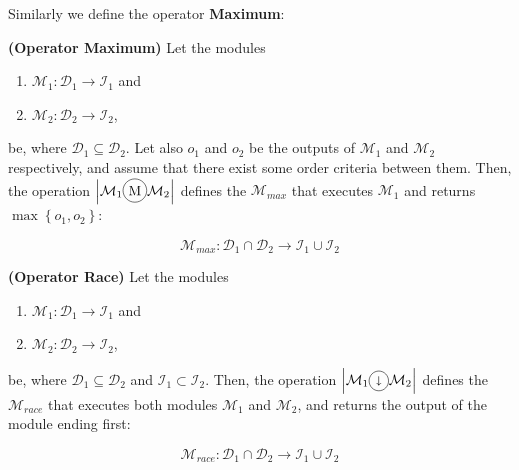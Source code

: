 Similarly we define the operator \textbf{Maximum}:

\begin{definition}\label{op:max}
{\bf (Operator Maximum)} Let the modules
\begin{enumerate}%
	\item $\mathcal{M}_1 : \mathcal{D}_1 \rightarrow \mathcal{I}_1$ and  
	\item $\mathcal{M}_2 : \mathcal{D}_2 \rightarrow \mathcal{I}_2$,
\end{enumerate}%
be, where $\mathcal{D}_1 \subseteq \mathcal{D}_2$. %
Let also $o_1$ and $o_2$ be the outputs of $\mathcal{M}_1$ and $\mathcal{M}_2$ respectively, and assume that there exist some order criteria between them. Then, the operation $\left|\mathcal{M}_1\circled{M}\mathcal{M}_2\right|$ defines the \cm{} $\mathcal{M}_{max}$ that executes $\mathcal{M}_1$ and returns $\max\left\{o_1,o_2\right\}$:

\[
\mathcal{M}_{max}:\mathcal{D}_1\cap\mathcal{D}_2 \rightarrow \mathcal{I}_1 \cup \mathcal{I}_2 
\]
\end{definition}

\begin{definition}\label{op:race}
{\bf (Operator Race)} Let the modules
\begin{enumerate}%
	\item $\mathcal{M}_1 : \mathcal{D}_1 \rightarrow \mathcal{I}_1$ and  
	\item $\mathcal{M}_2 : \mathcal{D}_2 \rightarrow \mathcal{I}_2$,
\end{enumerate}%
be, where $\mathcal{D}_1 \subseteq \mathcal{D}_2$ and $\mathcal{I}_1 \subset \mathcal{I}_2$. Then, the operation $\left|\mathcal{M}_1\circled{$\shortdownarrow$}\mathcal{M}_2\right|$ defines the \cm{} $\mathcal{M}_{race}$ that executes both modules $\mathcal{M}_1$ and $\mathcal{M}_2$, and returns the output of the module ending first:

\[
\mathcal{M}_{race}:\mathcal{D}_1\cap\mathcal{D}_2 \rightarrow \mathcal{I}_1 \cup \mathcal{I}_2 
\]
\end{definition}

